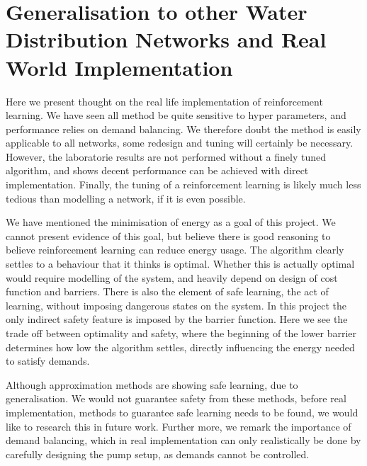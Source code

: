 \section{Generalisation to other Water Distribution Networks and Real World Implementation}
Here we present thought on the real life implementation of reinforcement learning. We have seen all method be quite sensitive to hyper parameters, and performance relies on demand balancing. We therefore doubt the method is easily applicable to all networks, some redesign and tuning will certainly be necessary. However, the laboratorie results are not performed without a finely tuned algorithm, and shows decent performance can be achieved with direct implementation. Finally, the tuning of a reinforcement learning is likely much less tedious than modelling a network, if it is even possible.

We have mentioned the minimisation of energy as a goal of this project. We cannot present evidence of this goal, but believe there is good reasoning to believe reinforcement learning can reduce energy usage. The algorithm clearly settles to a behaviour that it thinks is optimal. Whether this is actually optimal would require modelling of the system, and heavily depend on design of cost function and barriers. There is also the element of safe learning, the act of learning, without imposing dangerous states on the system. In this project the only indirect safety feature is imposed by the barrier function. Here we see the trade off between optimality and safety,  where the beginning of the lower barrier determines how low the algorithm settles, directly influencing the energy needed to satisfy demands.

Although approximation methods are showing safe learning, due to generalisation. We would not guarantee safety from these methods, before real implementation, methods to guarantee safe learning needs to be found, we would like to research this in future work. Further more, we remark the importance of demand balancing, which in real implementation can only realistically be done by carefully designing the pump setup, as demands cannot be controlled. 
